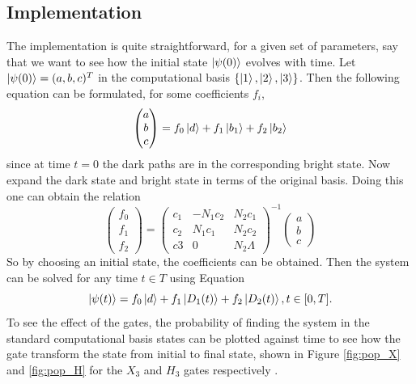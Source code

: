 \subsection{Implementation}
The implementation is quite straightforward, for a given set of parameters, say that we want to see how the initial state $\ket{\psi(0)}$ evolves with time.
Let $\ket{\psi(0)} = (a,b,c)^T$ in the computational basis $\{\ket{1},\ket{2},\ket{3}\}$. Then the following equation can be formulated, for some coefficients $f_i$,
\begin{equation}
\begin{pmatrix}
a\\
b\\
c
\end{pmatrix}
= f_0 \ket{d} + f_1\ket{b_1} + f_2\ket{b_2}
\end{equation}
since at time $t = 0$ the dark paths are in the corresponding bright state.
Now expand the dark state and bright state in terms of the original basis. Doing this one can obtain the relation
\begin{equation}
\begin{pmatrix}
f_0\\
f_1\\
f_2
\end{pmatrix} = \begin{pmatrix}
c_1 & -N_1 c_2 & N_2 c_1
\\
c_2 & N_1 c_1 & N_2 c_2
\\
c3 & 0 & N_2 \Lambda
\end{pmatrix}^{-1}\begin{pmatrix}
a\\
b\\
c
\end{pmatrix}
\end{equation}
So by choosing an initial state, the coefficients can be obtained.
Then the system can be solved for any time $t \in T$ using Equation 
\begin{equation}
\label{eq:expl-time}
\ket{\psi(t)} = f_0\ket{d} + f_1\ket{D_1(t)} + f_2\ket{D_2(t)}, t \in [0,T].
\end{equation}
To see the effect of the gates, the probability of finding the system in the standard computational basis states can be plotted against time to see how the gate transform the state from initial to final state, shown in Figure \ref{fig:pop_X} and \ref{fig:pop_H} for the $X_3$ and $H_3$ gates respectively . 
